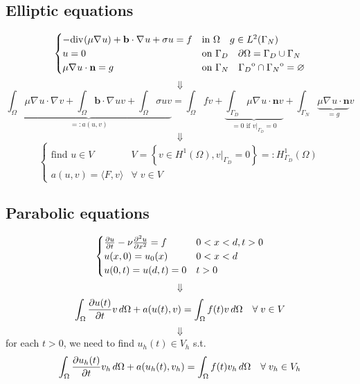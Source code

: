 \documentclass[a4paper,11pt]{article}
\theoremstyle{break}
\renewcommand*{\grad}{\nabla\mspace{1mu}}
\renewcommand*{\div}{\text{div}\mspace{1mu}}
\newcommand{\vect}[1]{\textbf{#1}}
\let\emptyset\varnothing
\newcommand*{\txt}[1]{\text{#1}}
\newcommand{\scalarproduct}[2]{\langle #1,#2 \rangle}
\newcommand{\interior}[1]{%
 {\kern0pt#1}^{\mathrm{o}}%
}
\newcommand{\find}{\txt{find }}
\numberwithin{equation}{section}
\begin{document}
\subsection*{Elliptic equations}
\begin{equation*}
    \begin{cases}
        -\div(\mu \grad u)+ \vect{b}\cdot \grad u + \sigma u = f& \text{in } \Omega \quad g \in L^2(\Gamma_N) \\
        u = 0 & \txt{on }\Gamma_D \quad \partial\Omega = \Gamma_D \cup \Gamma_N \\

        \mu \grad u \cdot \vect{n} = g & \txt{on } \Gamma_N \quad \interior{\Gamma_D} \cap \interior{\Gamma_N} = \emptyset
    \end{cases}
\end{equation*}
\[
    \Downarrow
\]
\begin{equation*}
    \underbrace{\int_\Omega \mu\grad u \cdot \grad v  + \int_\Omega \vect{b} \cdot \grad u v + \int_\Omega \sigma u v}_{=: a(u,v)} = \int_\Omega f v +\underbrace{\int_{\Gamma_D} \mu \grad u \cdot \vect{n} v}_{= 0 \txt{ if } v\vert_{\Gamma_D} = 0} + \int_{\Gamma_N} \underbrace{\mu \grad u \cdot \vect{n}}_{= g} v 
\end{equation*}
\[
    \Downarrow
\]
\begin{equation*}
    \begin{cases}
        \find u \in V & V = \left\{v \in H^1(\Omega), v\vert_{\Gamma_D} = 0\right\} =: H^1_{\Gamma_D}(\Omega)\\
        a(u,v) = \scalarproduct{F}{v} & \forall \; v \in V \label{Weak Formulation of Boundary Value Problems}
    \end{cases}
\end{equation*}
\subsection*{Parabolic equations}
\begin{equation*}
    \begin{cases}
        \partialderivative{u}{t} - \nu \partialderivative{^2u}{x^2} = f & 0 < x <d, t> 0 \\
        u(x,0) = u_0(x) & 0 < x < d \\
        u(0,t) = u(d,t) = 0 & t>0
    \end{cases}
    \label{one_dim_pbl}
\end{equation*}
\[
    \Downarrow
\]
\begin{equation*}
    \int_{\Omega} \partialderivative{u(t)}{t} v \, d\Omega + a(u(t), v) = \int_\Omega f(t)v \, d\Omega \quad \forall \; v \in V 
    \label{weak_formulation_heat_pbl}
\end{equation*}
\[
    \Downarrow
\]
for each \(t > 0\), we need to find \(u_h(t) \in V_h\) s.t. 
\begin{equation*}
    \int_\Omega \partialderivative{u_h(t)}{t} v_h \, d\Omega + a(u_h(t), v_h) = \int_\Omega f(t)v_h \, d\Omega \quad \forall \; v_h \in V_h
\label{semi-discretization_pbl}
\end{equation*}
\end{document}
